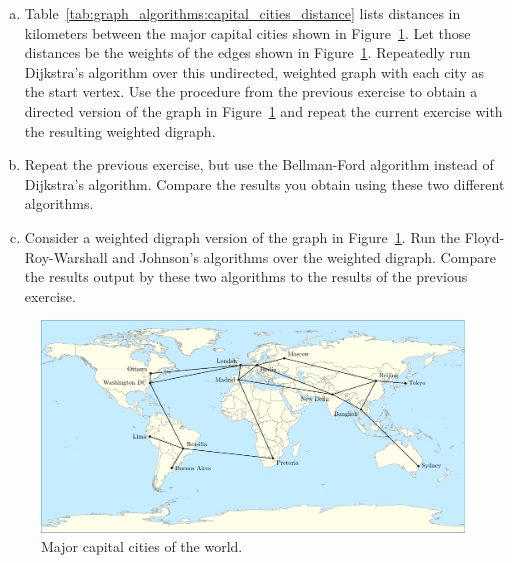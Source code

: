 \begin{problem}
\begin{enumerate}[(a)]
  \item Table~\ref{tab:graph_algorithms:capital_cities_distance} lists
    distances in kilometers between the major capital cities shown in
    Figure~\ref{fig:graph_algorithms:worldmap_capital_cities}. Let
    those distances be the weights of the edges shown in
    Figure~\ref{fig:graph_algorithms:worldmap_capital_cities}. Repeatedly
    run Dijkstra's algorithm over this
    undirected, weighted graph with each city as the start vertex. Use
    the procedure from the previous exercise to obtain a directed
    version of the graph in
    Figure~\ref{fig:graph_algorithms:worldmap_capital_cities} and
    repeat the current exercise with the resulting weighted digraph.

  \item Repeat the previous exercise, but use the
    Bellman-Ford algorithm instead of
    Dijkstra's algorithm. Compare the
    results you obtain using these two different algorithms.

  \item Consider a weighted digraph version of the graph in
    Figure~\ref{fig:graph_algorithms:worldmap_capital_cities}. Run the
    Floyd-Roy-Warshall and
    Johnson's algorithms over the weighted
    digraph. Compare the results output by these two algorithms to the
    results of the previous exercise.
  \end{enumerate}

\begin{landscape}
\begin{figure}[!htbp]
\centering
{}
\includegraphics{image/graph-algorithms/worldmap-capital-cities}
\caption{Major capital cities of the world.}
\label{fig:graph_algorithms:worldmap_capital_cities}
\end{figure}
\end{landscape}


\end{problem}
